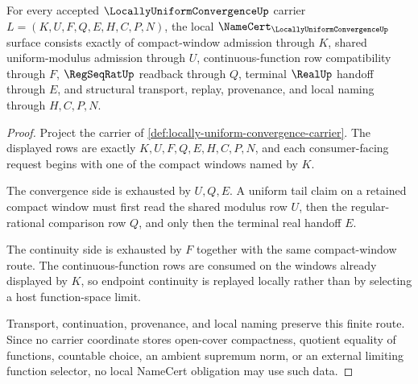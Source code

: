 \begin{theorem}
\label{thm:locally-uniform-convergence-namecert-obligations}
For every accepted $\LocallyUniformConvergenceUp$ carrier $L=(K,U,F,Q,E,H,C,P,N)$, the local $\NameCert_{\LocallyUniformConvergenceUp}$ surface consists exactly of compact-window admission through $K$, shared uniform-modulus admission through $U$, continuous-function row compatibility through $F$, $\RegSeqRatUp$ readback through $Q$, terminal $\RealUp$ handoff through $E$, and structural transport, replay, provenance, and local naming through $H,C,P,N$.
\end{theorem}
\begin{proof}
Project the carrier of \autoref{def:locally-uniform-convergence-carrier}. The displayed rows are exactly $K,U,F,Q,E,H,C,P,N$, and each consumer-facing request begins with one of the compact windows named by $K$.

The convergence side is exhausted by $U,Q,E$. A uniform tail claim on a retained compact window must first read the shared modulus row $U$, then the regular-rational comparison row $Q$, and only then the terminal real handoff $E$.

The continuity side is exhausted by $F$ together with the same compact-window route. The continuous-function rows are consumed on the windows already displayed by $K$, so endpoint continuity is replayed locally rather than by selecting a host function-space limit.

Transport, continuation, provenance, and local naming preserve this finite route. Since no carrier coordinate stores open-cover compactness, quotient equality of functions, countable choice, an ambient supremum norm, or an external limiting function selector, no local NameCert obligation may use such data.
\end{proof}


